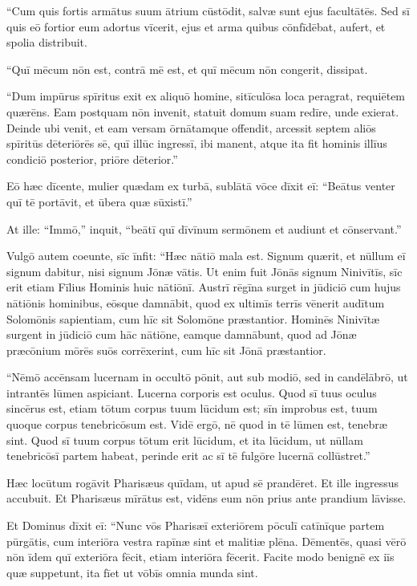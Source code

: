 \Versus ``Cum quis fortis armātus suum ātrium cūstōdit, salvæ sunt ejus facultātēs.
\Versus Sed sī quis eō fortior eum adortus vīcerit, ejus et arma quibus cōnfīdēbat, aufert, et spolia distribuit.

\Versus ``Quī mēcum nōn est, contrā mē est, et quī mēcum nōn congerit, dissipat.

\Versus ``Dum impūrus spīritus exit ex aliquō homine, sitīculōsa loca peragrat, requiētem quærēns. Eam postquam nōn invenit, statuit domum suam redīre, unde exierat.
\Versus Deinde ubi venit, et eam versam ōrnātamque offendit,
\Versus arcessit septem aliōs spīritūs dēteriōrēs sē, quī illūc ingressī, ibi manent, atque ita fit hominis illīus condiciō posterior, priōre dēterior.''

\Versus Eō hæc dīcente, mulier quædam ex turbā, sublātā vōce dīxit eī: ``Beātus venter quī tē portāvit, et ūbera quæ sūxistī.''

\Versus At ille: ``Immō,'' inquit, ``beātī quī dīvīnum sermōnem et audiunt et cōnservant.''

\Versus Vulgō autem coeunte, sīc īnfit: ``Hæc nātiō mala est. Signum quærit, et nūllum eī signum dabitur, nisi signum Jōnæ vātis.
\Versus Ut enim fuit Jōnās signum Ninivītīs, sīc erit etiam Fīlius Hominis huic nātiōnī.
\Versus Austrī rēgīna surget in jūdiciō cum hujus nātiōnis hominibus, eōsque damnābit, quod ex ultimīs terrīs vēnerit audītum Solomōnis sapientiam, cum hīc sit Solomōne præstantior.
\Versus Hominēs Ninivītæ surgent in jūdiciō cum hāc nātiōne, eamque damnābunt, quod ad Jōnæ præcōnium mōrēs suōs corrēxerint, cum hīc sit Jōnā præstantior.

\Versus ``Nēmō accēnsam lucernam in occultō pōnit, aut sub modiō, sed in candēlābrō, ut intrantēs lūmen aspiciant.
\Versus Lucerna corporis est oculus. Quod sī tuus oculus sincērus est, etiam tōtum corpus tuum lūcidum est; sīn improbus est, tuum quoque corpus tenebricōsum est.
\Versus Vidē ergō, nē quod in tē lūmen est, tenebræ sint.
\Versus Quod sī tuum corpus tōtum erit lūcidum, et ita lūcidum, ut nūllam tenebricōsī partem habeat, perinde erit ac sī tē fulgōre lucernā collūstret.''

\Versus Hæc locūtum rogāvit Pharisæus quīdam, ut apud sē prandēret. Et ille ingressus accubuit.
\Versus Et Pharisæus mīrātus est, vidēns eum nōn prius ante prandium lāvisse.

\Versus Et Dominus dīxit eī: ``Nunc vōs Pharisæī exteriōrem pōculī catīnīque partem pūrgātis, cum interiōra vestra rapīnæ sint et malitiæ plēna.
\Versus Dēmentēs, quasi vērō nōn īdem quī exteriōra fēcit, etiam interiōra fēcerit.
\Versus Facite modo benignē ex iīs quæ suppetunt, ita fīet ut vōbīs omnia munda sint.

